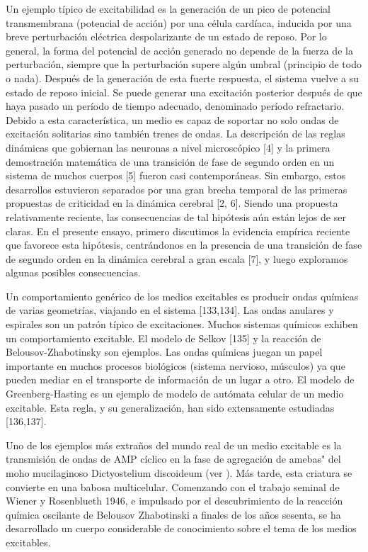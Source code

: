 Un ejemplo típico de excitabilidad es la generación de un pico de potencial transmembrana (potencial de acción) por una célula cardíaca, inducida por una breve perturbación eléctrica despolarizante de un estado de reposo. Por lo general, la forma del potencial de acción generado no depende de la fuerza de la perturbación, siempre que la perturbación supere algún umbral (principio de todo o nada). Después de la generación de esta fuerte respuesta, el sistema vuelve a su estado de reposo inicial. Se puede generar una excitación posterior después de que haya pasado un período de tiempo adecuado, denominado período refractario. Debido a esta característica, un medio es capaz de soportar no solo ondas de excitación solitarias sino también trenes de ondas. La descripción de las reglas dinámicas que gobiernan las neuronas a nivel microscópico [4] y la primera demostración matemática de una transición de fase de segundo orden en un sistema de muchos cuerpos [5] fueron casi contemporáneas. Sin embargo, estos desarrollos estuvieron separados por una gran brecha temporal de las primeras propuestas de criticidad en la dinámica cerebral [2, 6]. Siendo una propuesta relativamente reciente, las consecuencias de tal hipótesis aún están lejos de ser claras. En el presente ensayo, primero discutimos la evidencia empírica reciente que favorece esta hipótesis, centrándonos en la presencia de una transición de fase de segundo orden en la dinámica cerebral a gran escala [7], y luego exploramos algunas posibles consecuencias. 


Un comportamiento genérico de los medios excitables es producir ondas químicas de varias geometrías, viajando en el sistema [133,134]. Las ondas anulares y espirales son un patrón típico de excitaciones. Muchos sistemas químicos exhiben un comportamiento excitable. El modelo de Selkov [135] y la reacción de Belousov-Zhabotinsky son ejemplos. Las ondas químicas juegan un papel importante en muchos procesos biológicos (sistema nervioso, músculos) ya que pueden mediar en el transporte de información de un lugar a otro. El modelo de Greenberg-Hasting es un ejemplo de modelo de autómata celular de un medio excitable. Esta regla, y su generalización, han sido extensamente estudiadas [136,137].

Uno de los ejemplos más extraños del mundo real de un medio excitable es la transmisión de ondas de \gls{AMP} cíclico en la fase de agregación de amebas" del moho mucilaginoso Dictyostelium discoideum (ver ). Más tarde, esta criatura se convierte en una babosa multicelular.  Comenzando con el trabajo seminal de Wiener y Rosenblueth 1946, e impulsado por el descubrimiento de la reacción química oscilante de Belousov Zhabotinski a finales de los años sesenta, se ha desarrollado un cuerpo considerable de conocimiento sobre el tema de los medios excitables. 

